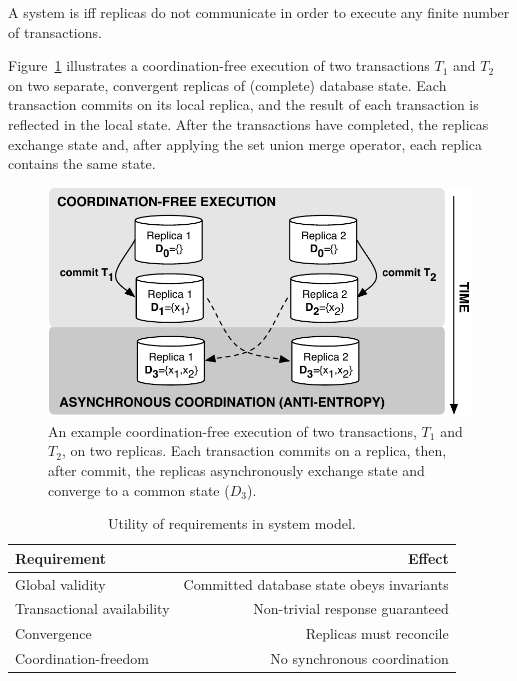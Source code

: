 \begin{definition}
A system is \textit{\cfree} iff replicas do not communicate in order to
execute any finite number of transactions.
\end{definition}

Figure~\ref{fig:replicas} illustrates a coordination-free execution of
two transactions $T_1$ and $T_2$ on two separate, convergent replicas
of (complete) database state. Each transaction commits on its local
replica, and the result of each transaction is reflected in the local
state. After the transactions have completed, the replicas exchange
state and, after applying the set union merge operator, each replica
contains the same state.

\begin{figure}
\begin{center}
\includegraphics[width=.85\columnwidth]{figs/replicas.pdf}
\end{center}\vspace{-1em}
\caption{An example coordination-free execution of two transactions,
  $T_1$ and $T_2$, on two replicas. Each transaction commits
  on a replica, then, after commit, the replicas asynchronously
  exchange state and converge to a common state ($D_3$).}
\label{fig:replicas}
\end{figure}


\begin{table}
\begin{center}
\small
\begin{tabular}{|l|r|}
\hline\textbf{Requirement} & \textbf{Effect}  \\\hline
Global validity & Committed database state obeys invariants  \\
Transactional availability & Non-trivial response guaranteed \\
Convergence & Replicas must reconcile \\
Coordination-freedom & No synchronous coordination\\\hline
\end{tabular}
\end{center}\vspace{-1em}
\caption{Utility of requirements in system model.}
\label{table:requirements}
\end{table}


